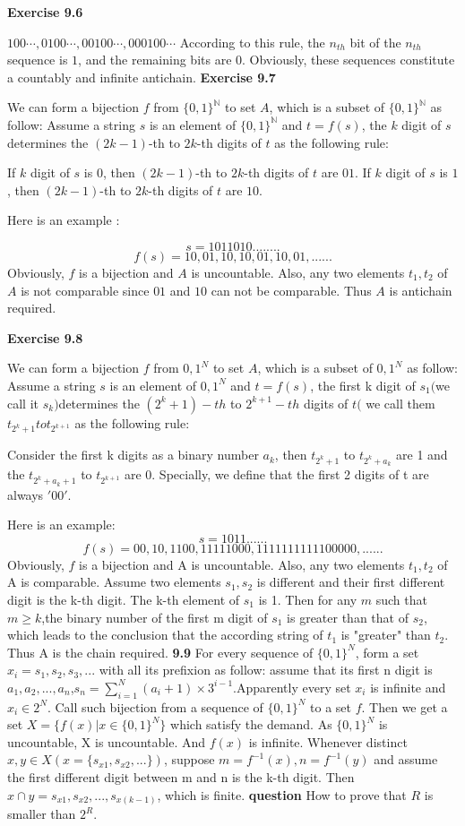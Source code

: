 \documentclass{article} %
\begin{document}
	\textbf{Exercise 9.6}\par
	$100\cdots,0100\cdots,00100\cdots,000100\cdots$ According to this rule, the $n_{th}$ bit of the $n_{th}$ sequence is $1$, and the remaining bits are $0$. Obviously, these sequences constitute a countably and infinite antichain.
	\textbf{Exercise 9.7}\par
    	We can form a bijection $f$ from ${\{0,1\}}^{\mathbb{N}}$ to set $A$, which is a subset of ${\{0,1\}}^{\mathbb{N}}$ as follow:
	Assume a string $s$ is an element of ${\{0,1\}}^{\mathbb{N}}$ and $t=f(s)$, the $k$ digit of $s$ determines the $(2k-1)$-th to 
	$2k$-th digits of $t$ as the following rule:\par
	If $k$ digit of $s$ is $0$, then $(2k-1)$-th to $2k$-th digits of $t$ are $01$. If $k$ digit of $s$ is $1$, then $(2k-1)$-th to $2k$-th digits of $t$ are $10$. \par
	Here is an example :\par
	$$
	s=1011010........
	$$
	$$
	f(s)=10,01,10,10,01,10,01,......
	$$
	Obviously, $f$ is a bijection and $A$ is uncountable. Also, any two elements $t_{1},t_{2}$ of $A$ is not comparable since $01$ and $10$ can not be comparable.
	Thus $A$ is antichain required.\par
	\textbf{Exercise 9.8}\par
	 We can form a bijection $f$ from ${0,1}^N$ to set $A$, which is a subset of ${0,1}^N$ as follow: Assume a string $s$ is an element of ${0,1}^N$ and  $t=f(s)$, the first k digit of $s_1 ($we call it $s_k)$determines the $(2^{k}+1)-th$ to $2^{k+1}-th $ digits of $t ($ we  call them $t_{2^k+1} to t_{2^{k+1}}$ as the following rule:\par
	 
	 	 Consider the first k digits as a binary number $a_k$, then $t_{2^k+1}$ to $t_{2^k+a_k}$ are 1 and the $t_{2^k+a_k+1}$ to $t_{2^{k+1}}$ are 0. Specially, we define that the first 2 digits of t are always $'00'$.  
	 
	 Here is an example:
	 $$
	 s=1011......
	 $$
	 $$
	 f(s)=00,10,1100,11111000,1111111111100000,......
	 $$
	 Obviously, $f$ is a bijection and A is uncountable. Also, any two elements $t_1,t_2$ of A is comparable. Assume two elements $s_1,s_2$ is different and their first different digit is the k-th digit. The k-th element of $s_1$ is 1. Then for any $m$ such that $m \ge k$,the binary number of the first m digit of $s_1$ is greater than that of $s_2$, which leads to the conclusion that the according string of $t_1$ is "greater" than $t_2$. Thus A is the chain required. 
  \textbf{9.9}
	  For every sequence of $\{0,1\} ^N$, form a set$x_i={s_1,s_2,s_3,...}$ with all its prefixion as follow: assume that its first n digit is $a_1,a_2,...,a_n$,$s_n=\sum_{i=1}^N(a_i+1)\times 3^{i-1}$.Apparently every set $x_i$ is infinite and $x_i\in 2^N$. Call such bijection from a sequence of $\{0,1\}^N$ to a set $f$. Then we get a set $X=\{f(x)|x\in \{0,1\}^N\}$ which satisfy the demand. As $\{0,1\} ^N$ is uncountable, X is uncountable. And $f(x)$ is infinite. Whenever distinct $x,y \in X(x=\{s_{x1},s_{x2},...\})$, suppose $m=f^{-1}(x),n=f^{-1}(y)$ and assume the first different digit between m and n is the k-th digit. Then $x\cap y={s_{x1},s_{x2},...,s_{x(k-1)}}$, which is finite.
	 \textbf{question}
	 How to prove that $R$ is smaller than $2^R$.
	
\end{document}
